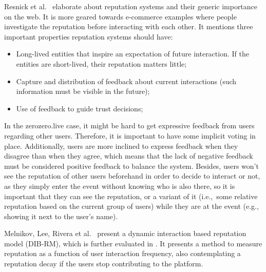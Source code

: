 Resnick et al.\ \cite{Resnick2000} elaborate about reputation systems and their generic importance on the web. It is more geared towards e-commerce examples where people investigate the reputation before interacting with each other. It mentions three important properties reputation systems should have:
\begin{itemize}
    \item Long-lived entities that inspire an expectation of future interaction. If the entities are short-lived, their reputation matters little;
    \item Capture and distribution of feedback about current interactions (such information must be visible in the future);
    \item Use of feedback to guide trust decisions;
\end{itemize}
In the zerozero.live case, it might be hard to get expressive feedback from users regarding other users. Therefore, it is important to have some implicit voting in place. Additionally, users are more inclined to express feedback when they disagree than when they agree, which means that the lack of negative feedback must be considered positive feedback to balance the system. Besides, users won't see the reputation of other users beforehand in order to decide to interact or not, as they simply enter the event without knowing who is also there, so it is important that they can see the reputation, or a variant of it (i.e.,\ some relative reputation based on the current group of users) while they are at the event (e.g., showing it next to the user's name).

Melnikov, Lee, Rivera et al.\ \cite{Melnikov2018} present a dynamic interaction based reputation model (DIB-RM), which is further evaluated in \cite{Yashkina2020}. It presents a method to measure reputation as a function of user interaction frequency, also contemplating a reputation decay if the users stop contributing to the platform. 


